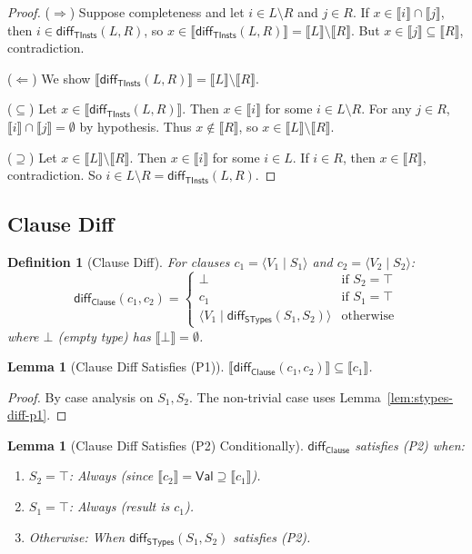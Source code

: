 \documentclass[11pt]{article}
\newtheorem{lemma}[theorem]{Lemma}
\newtheorem{definition}[theorem]{Definition}
\newcommand{\sem}[1]{\llbracket #1 \rrbracket}
\newcommand{\diff}{\mathsf{diff}}
\newcommand{\Clause}{\mathsf{Clause}}
\newcommand{\STypes}{\mathsf{STypes}}
\newcommand{\TInsts}{\mathsf{TInsts}}
\newcommand{\Val}{\mathsf{Val}}
\newcommand{\clause}[2]{\langle #1 \mid #2 \rangle}
\begin{document}
\begin{proof}
($\Rightarrow$) Suppose completeness and let $i \in L \setminus R$ and $j \in R$.
If $x \in \sem{i} \cap \sem{j}$, then $i \in \diff_{\TInsts}(L, R)$, so $x \in \sem{\diff_{\TInsts}(L, R)} = \sem{L} \setminus \sem{R}$.
But $x \in \sem{j} \subseteq \sem{R}$, contradiction.

($\Leftarrow$) We show $\sem{\diff_{\TInsts}(L, R)} = \sem{L} \setminus \sem{R}$.

($\subseteq$) Let $x \in \sem{\diff_{\TInsts}(L, R)}$. Then $x \in \sem{i}$ for some $i \in L \setminus R$.
For any $j \in R$, $\sem{i} \cap \sem{j} = \emptyset$ by hypothesis.
Thus $x \notin \sem{R}$, so $x \in \sem{L} \setminus \sem{R}$.

($\supseteq$) Let $x \in \sem{L} \setminus \sem{R}$. Then $x \in \sem{i}$ for some $i \in L$.
If $i \in R$, then $x \in \sem{R}$, contradiction. So $i \in L \setminus R = \diff_{\TInsts}(L, R)$.
\end{proof}

\subsection{Clause Diff}

\begin{definition}[Clause Diff]
\label{def:clause-diff}
For clauses $c_1 = \clause{V_1}{S_1}$ and $c_2 = \clause{V_2}{S_2}$:
\[
\diff_{\Clause}(c_1, c_2) = 
\begin{cases}
\bot & \text{if } S_2 = \top \\
c_1 & \text{if } S_1 = \top \\
\clause{V_1}{\diff_{\STypes}(S_1, S_2)} & \text{otherwise}
\end{cases}
\]
where $\bot$ (empty type) has $\sem{\bot} = \emptyset$.
\end{definition}

\begin{lemma}[Clause Diff Satisfies (P1)]
\label{lem:clause-diff-p1}
$\sem{\diff_{\Clause}(c_1, c_2)} \subseteq \sem{c_1}$.
\end{lemma}

\begin{proof}
By case analysis on $S_1, S_2$. The non-trivial case uses Lemma~\ref{lem:stypes-diff-p1}.
\end{proof}

\begin{lemma}[Clause Diff Satisfies (P2) Conditionally]
\label{lem:clause-diff-p2-conditional}
$\diff_{\Clause}$ satisfies (P2) when:
\begin{enumerate}
\item $S_2 = \top$: Always (since $\sem{c_2} = \Val \supseteq \sem{c_1}$).
\item $S_1 = \top$: Always (result is $c_1$).
\item Otherwise: When $\diff_{\STypes}(S_1, S_2)$ satisfies (P2).
\end{enumerate}
\end{lemma}
\end{document}
